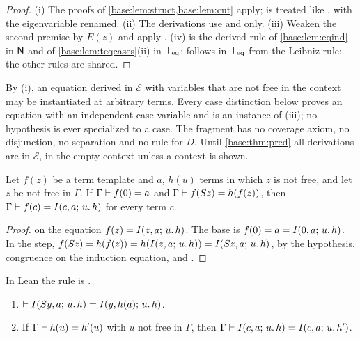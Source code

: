 \begin{proof}
(i) The proofs of \cref{base:lem:struct,base:lem:cut} apply; 
is treated like , with the eigenvariable renamed.  (ii) The
derivations use  and  only.  (iii) Weaken the
second premise by $E(z)$ and apply .  (iv)  is the
derived rule of \cref{base:lem:eqind} in $\mathsf{N}$ and of
\cref{base:lem:teqcases}(ii) in $\mathsf{T}_{\mathrm{eq}}$;  follows in $\mathsf{T}_{\mathrm{eq}}$ from
the Leibniz rule; the other rules are shared.
\end{proof}

By (i), an equation derived in $\mathcal E$ with variables that are not free
in the context may be instantiated at arbitrary terms.  Every case
distinction below proves an equation with an independent case variable and
is an instance of (iii); no hypothesis is ever specialized to a case.  The
fragment has no coverage axiom, no disjunction, no separation and no rule
for $D$.  Until \cref{base:thm:pred} all derivations are in
$\mathcal E$, in the empty context unless a context is shown.

\begin{lemma}
\label{base:lem:uniq}
Let $f(z)$ be a term template and $a$, $h(u)$ terms in which $z$ is not
free, and let $z$ be not free in $\Gamma$.  If
$\Gamma\vdash f(0)=a$ and $\Gamma\vdash f(S z)=h(f(z))$, then
$\Gamma\vdash f(c)=I(c,a;\,u.\,h)$ for every term $c$.
\end{lemma}

\begin{proof}
 on the equation $f(z)=I(z,a;\,u.\,h)$.  The base is
$f(0)=a=I(0,a;\,u.\,h)$.  In the step,
$f(S z)=h(f(z))=h(I(z,a;\,u.\,h))=I(S z,a;\,u.\,h)$, by the
hypothesis, congruence on the induction equation, and .
\end{proof}

In Lean the rule is .

\begin{corollary}
\label{base:cor:rot}
\begin{enumerate}[label=\textup{(\roman*)}]
\item $\vdash I(S y,a;\,u.\,h)=I(y,h(a);\,u.\,h)$.
\item If $\Gamma\vdash h(u)=h'(u)$ with $u$ not free in $\Gamma$, then
 $\Gamma\vdash I(c,a;\,u.\,h)=I(c,a;\,u.\,h')$.
\end{enumerate}
\end{corollary}

